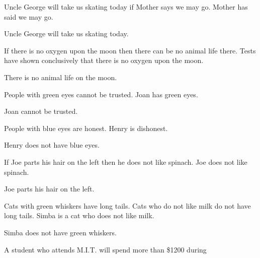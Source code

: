 \documentclass[11pt]{book}
\begin{document}
\begin{exercisecols}
\begin{exlist}
\item \begin{hyp}Uncle George will take us skating today if Mother says we may go.
      Mother has said we may go.\end{hyp}
      \begin{thmclaim}Uncle George will take us skating today.\end{thmclaim}
\item \begin{hyp}If there is no oxygen upon the moon then there can be no animal
      life there. Tests have shown conclusively that there is no oxygen upon the
      moon.\end{hyp}
      \begin{thmclaim}There is no animal life on the moon.\end{thmclaim}
\item \begin{hyp}People with green eyes cannot be trusted. Joan has green
      eyes.\end{hyp}
      \begin{thmclaim}Joan cannot be trusted.\end{thmclaim}
\item \begin{hyp}People with blue eyes are honest. Henry is dishonest.\end{hyp}
      \begin{thmclaim}Henry does not have blue eyes.\end{thmclaim}
\item \begin{hyp}If Joe parts his hair on the left then he does not like spinach.
      Joe does not like spinach.\end{hyp}
      \begin{thmclaim}Joe parts his hair on the left.\end{thmclaim}
\item \begin{hyp}Cats with green whiskers have long tails. Cats who do not like
      milk do not have long tails. Simba is a cat who does not like milk.\end{hyp}
      \begin{thmclaim}Simba does not have green whiskers.\end{thmclaim}
\item \begin{hyp}A student who attends M.I.T. will spend more than \$1200 during

\end{hyp}
\end{exlist}
\end{exercisecols}
\end{document}
